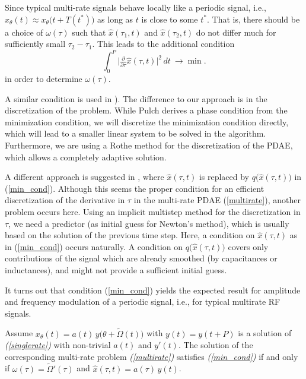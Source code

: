 \documentclass{siamltex}
\begin{document}
Since typical multi-rate signals behave locally like
a periodic signal, i.e.,
$x_\theta(t) \approx x_\theta(t+T(t^*){{{)}}}$ as long as $t$ is close to some $t^*$. 
That is, there should be a choice of $\omega(\tau)$ such that 
$\hat{x}(\tau_1,t)$ and $\hat{x}(\tau_2,t)$ do not differ much for sufficiently small
$\tau_2-\tau_1$.
This leads to the additional condition
\begin{equation}\label{min_cond}
\int_0^P \Big|\tfrac{\partial}{\partial\tau}\hat{x}(\tau,t)\Big|^2\,dt\
\to \min.
\end{equation}
in order to determine $\omega(\tau)$.
{{{A similar condition is used in \cite{Pulch08a}). The difference to our approach is in the discretization
of the problem. While Pulch derives a phase condition from the minimization condition, we will discretize
the minimization condition directly, which will lead to a smaller linear system to be solved in the algorithm.
Furthermore, we are using a Rothe method for the discretization of the PDAE, which allows a completely adaptive solution.

A different approach is suggested in  \cite{Hou04}, where $\hat{x}(\tau,t)$
is replaced by $q\big(\hat{x}(\tau,t)\big)$ in (\ref{min_cond}). Although this seems the proper condition for an 
efficient discretization of  the derivative in $\tau$ in the multi-rate PDAE (\ref{multirate}), another problem occurs here.
Using an implicit multistep method for the discretization in $\tau$, we need a predictor
(as initial guess for Newton's method), which is usually based on the solution
of the previous time step. Here, a condition on  $\hat{x}(\tau,t)$ as in (\ref{min_cond}) occurs naturally. A condition
on $q\big(\hat{x}(\tau,t)\big)$ covers only contributions of the signal which are already smoothed 
(by capacitances or inductances), and might not provide a sufficient initial guess.}}} 

It turns out that condition (\ref{min_cond}) yields the expected result for amplitude and 
frequency modulation of a periodic signal{{{, i.e., for typical multirate RF signals.}}}

\begin{lemma}\label{mr_modulated}
Assume 
$x_\theta(t)=a(t)\,y\big(\theta+\tilde{\Omega}(t)\big)$ with $y(t)=y(t+P)$ is a solution of 
\emph{(\ref{singlerate})}
with non-trivial $a(t)$ and $y'(t)$.
The solution of the corresponding multi-rate problem \emph{(\ref{multirate})} 
satisfies \emph{(\ref{min_cond})} if and only if
$\omega(\tau)=\tilde{\Omega}'(\tau)$
and $\hat{x}(\tau,t) = a(\tau)\,y(t)$.
\end{lemma}
\end{document}

